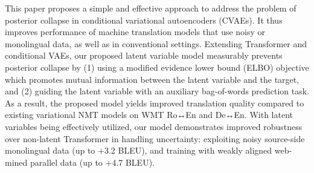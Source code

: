 This paper proposes a simple and effective approach to address the problem of posterior collapse in conditional variational autoencoders (CVAEs). It thus improves performance of machine translation models that use noisy or monolingual data, as well as in conventional settings. Extending Transformer and conditional VAEs, our proposed latent variable model measurably prevents posterior collapse by (1) using a modified evidence lower bound (ELBO) objective which promotes mutual information between the latent variable and the target, and (2) guiding the latent variable with an auxiliary bag-of-words prediction task. As a result, the proposed model yields improved translation quality compared to existing variational NMT models on WMT Ro↔En and De↔En. With latent variables being effectively utilized, our model demonstrates improved robustness over non-latent Transformer in handling uncertainty: exploiting noisy source-side monolingual data (up to +3.2 BLEU), and training with weakly aligned web-mined parallel data (up to +4.7 BLEU).
